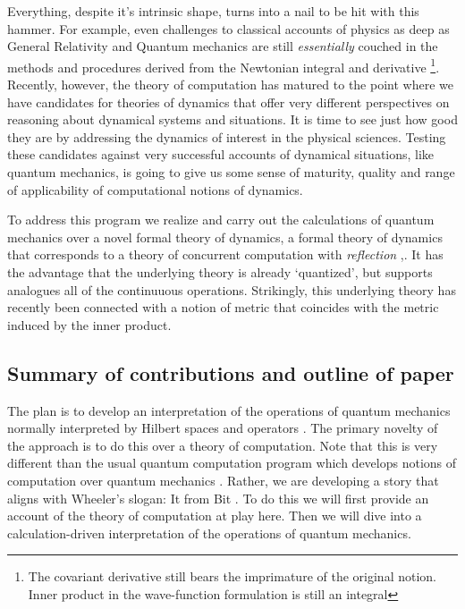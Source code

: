 Everything, despite it's intrinsic shape, turns into a
nail to be hit with this hammer. For example, even challenges to
classical accounts of physics as deep as General Relativity
\cite{Gravitation} and Quantum mechanics \cite{Dirac1930} are still
\emph{essentially} couched in the methods and procedures derived from
the Newtonian integral and derivative \footnote{The covariant
  derivative still bears the imprimature of the original notion. Inner
  product in the wave-function formulation is still an
  integral}. Recently, however, the theory of computation has matured
to the point where we have candidates for theories of dynamics that
offer very different perspectives on reasoning about dynamical systems
and situations. It is time to see just how good they are by addressing
the dynamics of interest in the physical sciences. Testing these
candidates against very successful accounts of dynamical situations,
like quantum mechanics, is going to give us some sense of maturity,
quality and range of applicability of computational notions of
dynamics.

To address this program we realize and carry out the calculations of
quantum mechanics over a novel formal theory of dynamics, a formal
theory of dynamics that corresponds to a theory of concurrent
computation with \emph{reflection}
\cite{bcsmith:phdthesis},\cite{319871}. It has the advantage that the
underlying theory is already `quantized', but supports analogues all
of the continuuous operations. Strikingly, this underlying theory has
recently been connected with a notion of metric
\cite{DBLP:conf/fossacs/BreugelMOW03} that coincides with the metric
induced by the inner product.

\subsection{Summary of contributions and outline of paper}

The plan is to develop an interpretation of the operations of quantum
mechanics normally interpreted by Hilbert spaces and operators
\cite{MathematicalFoundationsQM}. The primary novelty of the approach
is to do this over a theory of computation. Note that this is very
different than the usual quantum computation program which develops
notions of computation over quantum mechanics \cite{544199}. Rather,
we are developing a story that aligns with Wheeler's slogan: It from
Bit \cite{HowComeTime}. To do this we will first provide an account of
the theory of computation at play here. Then we will dive into a
calculation-driven interpretation of the operations of quantum
mechanics.

